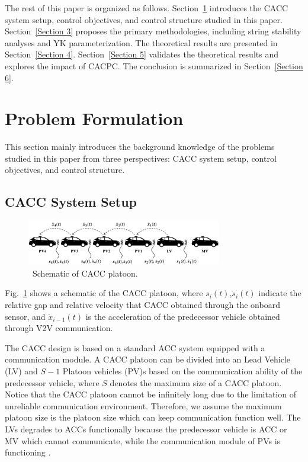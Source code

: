 \documentclass[journal]{IEEEtran}
\begin{document}
The rest of this paper is organized as follows. Section~\ref{Section 2} introduces the CACC system setup, control objectives, and control structure studied in this paper. Section~\ref{Section 3} proposes the primary methodologies, including string stability analyses and YK parameterization. The theoretical results are presented in Section~\ref{Section 4}. Section~\ref{Section 5} validates the theoretical results and explores the impact of CACPC. The conclusion is summarized in Section~\ref{Section 6}.


\section{Problem Formulation}
\label{Section 2}
This section mainly introduces the background knowledge of the problems studied in this paper from three perspectives: CACC system setup, control objectives, and control structure.


\subsection{CACC System Setup}
\label{Section 2.1}

\begin{figure}
  \centering
  \includegraphics[width=8.5cm]{figs/fig1.png}
  \caption{~Schematic of CACC platoon.}
  \label{fig1}
\end{figure}

Fig.~\ref{fig1} shows a schematic of the CACC platoon, where $s_i (t)$,$\dot{s}_{i} (t)$ indicate the relative gap and relative velocity that CACC obtained through the onboard sensor, and $\ddot{x}_{i-1} (t)$ is the acceleration of the predecessor vehicle obtained through V2V communication.

The CACC design is based on a standard ACC system equipped with a communication module. A CACC platoon can be divided into an Lead Vehicle (LV) and $S-1$ Platoon vehicles (PV)s based on the communication ability of the predecessor vehicle, where $S$ denotes the maximum size of a CACC platoon. Notice that the CACC platoon cannot be infinitely long due to the limitation of unreliable communication environment. Therefore, we assume the maximum platoon size is the platoon size which can keep communication function well. The LVs degrades to ACCs functionally because the predecessor vehicle is ACC or MV which cannot communicate, while the communication module of PVs is functioning \citep{dey2015review,navas2019mixing}.
\end{document}
